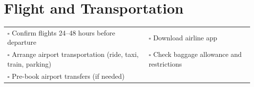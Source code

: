 
\section{Flight and Transportation}
\label{sec:flight}

\begin{tabular}{p{9cm} p{8cm}}
$\square$ Confirm flights 24–48 hours before departure & $\square$ Download airline app \\ 
$\square$ Arrange airport transportation (ride, taxi, train, parking) & $\square$ Check baggage allowance and restrictions \\ 
$\square$ Pre-book airport transfers (if needed) &  \\ 
\end{tabular}

